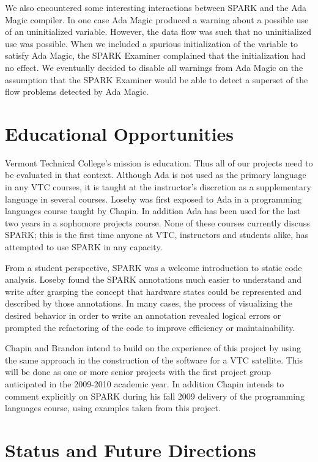 \documentclass{sig-alternate}
\begin{document}
We also encountered some interesting interactions between SPARK and the Ada Magic compiler. In
one case Ada Magic produced a warning about a possible use of an uninitialized variable.
However, the data flow was such that no uninitialized use was possible. When we included a
spurious initialization of the variable to satisfy Ada Magic, the SPARK Examiner complained that
the initialization had no effect. We eventually decided to disable all warnings from Ada Magic
on the assumption that the SPARK Examiner would be able to detect a superset of the flow
problems detected by Ada Magic.

\section{Educational Opportunities}

Vermont Technical College's mission is education. Thus all of our projects need to be evaluated
in that context. Although Ada is not used as the primary language in any VTC courses, it is
taught at the instructor's discretion as a supplementary language in several courses. Loseby was
first exposed to Ada in a programming languages course taught by Chapin. In addition Ada has
been used for the last two years in a sophomore projects course. None of these courses currently
discuss SPARK; this is the first time anyone at VTC, instructors and students alike, has
attempted to use SPARK in any capacity.

From a student perspective, SPARK was a welcome introduction to static code analysis. Loseby
found the SPARK annotations much easier to understand and write after grasping the concept that
hardware states could be represented and described by those annotations. In many cases, the
process of visualizing the desired behavior in order to write an annotation revealed logical
errors or prompted the refactoring of the code to improve efficiency or maintainability.

Chapin and Brandon intend to build on the experience of this project by using the same approach
in the construction of the software for a VTC satellite. This will be done as one or more senior
projects with the first project group anticipated in the 2009-2010 academic year. In addition
Chapin intends to comment explicitly on SPARK during his fall 2009 delivery of the programming
languages course, using examples taken from this project.

\section{Status and Future Directions}
\end{document}
